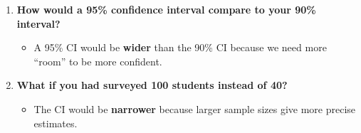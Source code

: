 \documentclass[
  letterpaper,
  DIV=11,
  numbers=noendperiod]{scrartcl}
\providecommand{\tightlist}{%
  \setlength{\itemsep}{0pt}\setlength{\parskip}{0pt}}\usepackage{longtable,booktabs,array}
\begin{document}
\begin{enumerate}
\def\labelenumi{\arabic{enumi}.}
\tightlist
\item
  \textbf{How would a 95\% confidence interval compare to your 90\%
  interval?}

  \begin{itemize}
  \tightlist
  \item
    A 95\% CI would be \textbf{wider} than the 90\% CI because we need
    more ``room'' to be more confident.
  \end{itemize}
\item
  \textbf{What if you had surveyed 100 students instead of 40?}

  \begin{itemize}
  \tightlist
  \item
    The CI would be \textbf{narrower} because larger sample sizes give
    more precise estimates.
  \end{itemize}
\end{enumerate}
\end{document}
